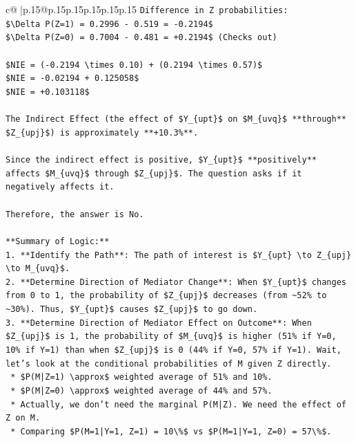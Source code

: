 \documentclass{article}
\begin{document}
{\begin{supertabular}{c@{$\;$}|p{.15\linewidth}@{}p{.15\linewidth}p{.15\linewidth}p{.15\linewidth}p{.15\linewidth}p{.15\linewidth}}
{{{\texttt{Difference in Z probabilities:} \\
\texttt{\$\textbackslash{}Delta P(Z=1) = 0.2996 {-} 0.519 = {-}0.2194\$} \\
\texttt{\$\textbackslash{}Delta P(Z=0) = 0.7004 {-} 0.481 = +0.2194\$ (Checks out)} \\
\\ 
\texttt{\$NIE = ({-}0.2194 \textbackslash{}times 0.10) + (0.2194 \textbackslash{}times 0.57)\$} \\
\texttt{\$NIE = {-}0.02194 + 0.125058\$} \\
\texttt{\$NIE = +0.103118\$} \\
\\ 
\texttt{The Indirect Effect (the effect of \$Y\_\{upt\}\$ on \$M\_\{uvq\}\$ **through** \$Z\_\{upj\}\$) is approximately **+10.3\%**.} \\
\\ 
\texttt{Since the indirect effect is positive, \$Y\_\{upt\}\$ **positively** affects \$M\_\{uvq\}\$ through \$Z\_\{upj\}\$. The question asks if it negatively affects it.} \\
\\ 
\texttt{Therefore, the answer is No.} \\
\\ 
\texttt{**Summary of Logic:**} \\
\texttt{1.  **Identify the Path**: The path of interest is \$Y\_\{upt\} \textbackslash{}to Z\_\{upj\} \textbackslash{}to M\_\{uvq\}\$.} \\
\texttt{2.  **Determine Direction of Mediator Change**: When \$Y\_\{upt\}\$ changes from 0 to 1, the probability of \$Z\_\{upj\}\$ decreases (from \textasciitilde{}52\% to \textasciitilde{}30\%). Thus, \$Y\_\{upt\}\$ causes \$Z\_\{upj\}\$ to go down.} \\
\texttt{3.  **Determine Direction of Mediator Effect on Outcome**: When \$Z\_\{upj\}\$ is 1, the probability of \$M\_\{uvq\}\$ is higher (51\% if Y=0, 10\% if Y=1) than when \$Z\_\{upj\}\$ is 0 (44\% if Y=0, 57\% if Y=1). Wait, let's look at the conditional probabilities of M given Z directly.} \\
\texttt{    *   \$P(M|Z=1) \textbackslash{}approx\$ weighted average of 51\% and 10\%.} \\
\texttt{    *   \$P(M|Z=0) \textbackslash{}approx\$ weighted average of 44\% and 57\%.} \\
\texttt{    *   Actually, we don't need the marginal P(M|Z). We need the effect of Z on M.} \\
\texttt{    *   Comparing \$P(M=1|Y=1, Z=1) = 10\textbackslash{}\%\$ vs \$P(M=1|Y=1, Z=0) = 57\textbackslash{}\%\$.} \\
}}}
\end{supertabular}}
\end{document}
